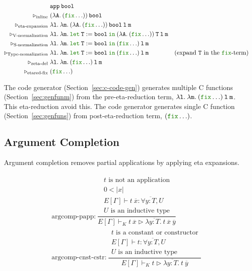 \documentclass[a4paper,fleqn]{article}
\newcommand{\kwlet}{\mbox{\color{mygreen}\ttfamily let}}
\newcommand{\kwin}{\mbox{\color{mygreen}\ttfamily in}}
\newcommand{\kwfix}{\mbox{\color{mygreen}\ttfamily fix}}
\newcommand{\lam}[2]{\lambda #1.\:#2}
\newcommand{\letin}[3]{\kwlet\:#1:=#2\:\kwin\:#3}
\newcommand{\breakrule}{\\[0.5em]}
\newcommand{\secref}[1]{Section~\ref{#1}}
\newcommand{\reltri}{\mathrel{\triangleright}}
\newcommand{\rep}[1]{\overline{#1}}
\begin{document}
\begin{align*}
  & \ttapp\:\ttbool \\
  \reltri_\textrm{inline}\; & (\lam{\ttA}{(\kwfix \ldots)})\:\ttbool \\
  \reltri_\textrm{eta-expansion}\; & \lam{\ttl}{\lam{\ttm}{(\lam{\ttA}{(\kwfix \ldots)})\:\ttbool\:\ttl\:\ttm}} \\
  \reltri_\textrm{V-normalization}\; & \lam{\ttl}{\lam{\ttm}{\letin{\ttT}{\ttbool}{(\lam{\ttA}{(\kwfix \ldots)})\:\ttT\:\ttl\:\ttm}}} \\
  \reltri_\textrm{S-normalization}\; & \lam{\ttl}{\lam{\ttm}{\letin{\ttT}{\ttbool}{(\kwfix \ldots)\:\ttl\:\ttm}}} \\
  \reltri_\textrm{Type-nomalization}\; & \lam{\ttl}{\lam{\ttm}{\letin{\ttT}{\ttbool}{(\kwfix \ldots)\:\ttl\:\ttm}}} & \textrm{(expand $\ttT$ in the \kwfix-term)} \\
  \reltri_\textrm{zeta-del}\; & \lam{\ttl}{\lam{\ttm}{(\kwfix \ldots)\:\ttl\:\ttm}} \\
  \reltri_\textrm{etared-fix}\; & (\kwfix \ldots) \\
\end{align*}

The code generator (\secref{sec:c-code-gen}) generates multiple C functions (\secref{sec:genfunm}) from the pre-eta-reduction term, $\lam{\ttl}{\lam{\ttm}{(\kwfix \ldots)\:\ttl\:\ttm}}$.
This eta-reduction avoid this.
The code generator generates single C function (\secref{sec:genfuns}) from post-eta-reduction term, $(\kwfix \ldots)$.

\subsection{Argument Completion}\label{sec:argcomp}
Argument completion removes partial applications by applying eta expansions.

\begin{gather*}
  \text{argcomp-papp:}~
    \dfrac{
      \begin{gathered}
        \text{$t$ is not an application} \\
        0 < |x| \\
        E[\Gamma] \vdash t\:\rep{x} : \forall \rep{y{:}T}, U \\
        \text{$U$ is an inductive type}
      \end{gathered}
    }{E[\Gamma] \vdash_K
        t\:\rep{x}
        \reltri
        \lam{\rep{y{:}T}}{t\:\rep{x}\:\rep{y}}
    } \breakrule
  \text{argcomp-cnst-cstr:}~
    \dfrac{
      \begin{gathered}
        \text{$t$ is a constant or constructor} \\
        E[\Gamma] \vdash t : \forall \rep{y{:}T}, U \\
        \text{$U$ is an inductive type}
      \end{gathered}
    }{E[\Gamma] \vdash_K
        t
        \reltri
        \lam{\rep{y{:}T}}{t\:\rep{y}}
    }
\end{gather*}
\end{document}
